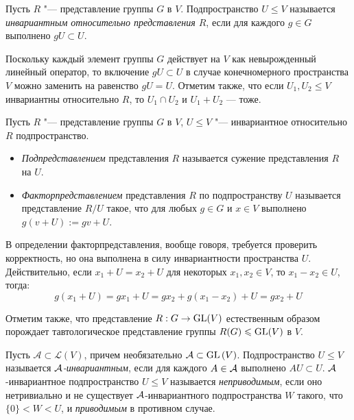 \begin{definition}
	Пусть $R$ "--- представление группы $G$ в $V$. Подпространство $U \le V$ называется \textit{инвариантным относительно представления $R$}, если для каждого $g \in G$ выполнено $gU \subset U$.
\end{definition}

\begin{note}
	Поскольку каждый элемент группы $G$ действует на $V$ как невырожденный линейный оператор, то включение $gU \subset U$ в случае конечномерного пространства $V$ можно заменить на равенство $gU = U$. Отметим также, что если $U_1, U_2 \le V$ инвариантны относительно $R$, то $U_1 \cap U_2$ и $U_1 + U_2$ --- тоже.
\end{note}

\begin{definition}
	Пусть $R$ "--- представление группы $G$ в $V$, $U \le V$ "--- инвариантное относительно $R$ подпространство.
	\begin{itemize}
		\item \textit{Подпредставлением} представления $R$ называется сужение представления $R$ на $U$.
		\item \textit{Факторпредставлением} представления $R$ по подпространству $U$ называется представление $R / U$ такое, что для любых $g \in G$ и $x \in V$ выполнено $g(v + U) := gv + U$.
	\end{itemize}
\end{definition}

\begin{note}
	В определении факторпредставления, вообще говоря, требуется проверить корректность, но она выполнена в силу инвариантности пространства $U$. Действительно, если $x_1 + U = x_2 + U$ для некоторых $x_1, x_2 \in V$, то $x_1 - x_2 \in U$, тогда:
	\[g(x_1 + U) = gx_1 + U = gx_2 + g(x_1 - x_2) + U = gx_2 + U\]
	
	Отметим также, что представление $R : G \to \operatorname{GL}(V)$ естественным образом порождает тавтологическое представление группы $R(G) \leqslant \operatorname{GL}(V)$ в $V$.
\end{note}

\begin{definition}
	Пусть $\mathcal A \subset \mathcal{L}(V)$, причем необязательно $\mathcal A \subset \operatorname{GL}{(V)}$. Подпространство $U \le V$ называется \textit{$\mathcal A$-инвариантным}, если для каждого $A \in \mathcal A$ выполнено $AU \subset U$. $\mathcal A$-инвариантное подпространство $U \le V$ называется \textit{неприводимым}, если оно нетривиально и не существует $\mathcal A$-инвариантного подпространства $W$ такого, что $\{0\} < W < U$, и \textit{приводимым} в противном случае.
\end{definition}

